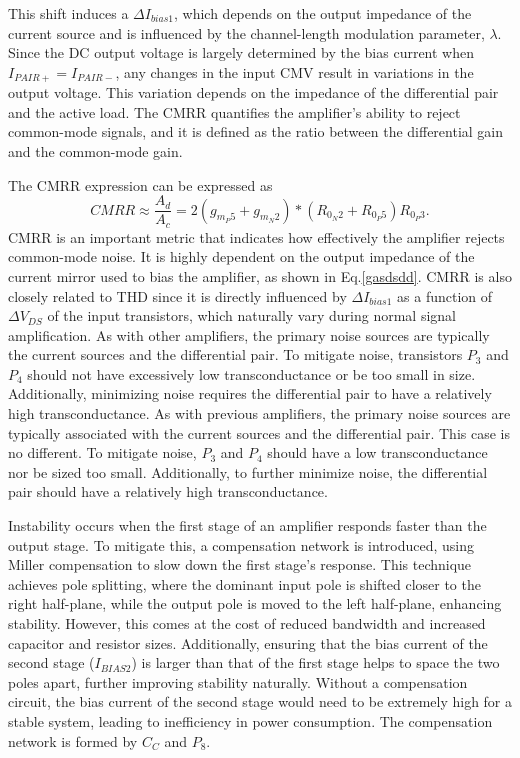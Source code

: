 \documentclass[12pt]{article}
\begin{document}
This shift induces a $\Delta I_{bias1}$, which depends on the output impedance of the current source and is influenced by the channel-length modulation parameter, $\lambda$.
Since the DC output voltage is largely determined by the bias current when $I_{PAIR+} = I_{PAIR-}$, any changes in the input CMV result in variations in the output voltage. This variation depends on the impedance of the differential pair and the active load. The CMRR quantifies the amplifier’s ability to reject common-mode signals, and it is defined as the ratio between the differential gain and the common-mode gain.

The CMRR expression can be expressed as
\begin{equation}
CMRR \approx \frac{A_d}{A_c} = 2(g_{m_P5}+g_{m_N2})*(R_{0_N2}+R_{0_P5})R_{0_P3}.
\label{gasdsdd}
\end{equation}
CMRR is an important metric that indicates how effectively the amplifier rejects common-mode noise. It is highly dependent on the output impedance of the current mirror used to bias the amplifier, as shown in Eq.\ref{gasdsdd}. CMRR is also closely related to THD since it is directly influenced by $\Delta I_{bias1}$ as a function of $\Delta V_{DS}$ of the input transistors, which naturally vary during normal signal amplification. As with other amplifiers, the primary noise sources are typically the current sources and the differential pair. To mitigate noise, transistors $P_3$ and $P_4$ should not have excessively low transconductance or be too small in size. Additionally, minimizing noise requires the differential pair to have a relatively high transconductance.
As with previous amplifiers, the primary noise sources are typically associated with the current sources and the differential pair. This case is no different. To mitigate noise, $P_3$ and $P_4$ should have a low transconductance nor be sized too small. Additionally, to further minimize noise, the differential pair should have a relatively high transconductance.


Instability occurs when the first stage of an amplifier responds faster than the output stage. To mitigate this, a compensation network is introduced, using Miller compensation to slow down the first stage’s response. This technique achieves pole splitting, where the dominant input pole is shifted closer to the right half-plane, while the output pole is moved to the left half-plane, enhancing stability. However, this comes at the cost of reduced bandwidth and increased capacitor and resistor sizes. Additionally, ensuring that the bias current of the second stage ($I_{BIAS2}$) is larger than that of the first stage helps to space the two poles apart, further improving stability naturally. Without a compensation circuit, the bias current of the second stage would need to be extremely high for a stable system, leading to inefficiency in power consumption. The compensation network is formed by $C_C$ and $P_8$.
\end{document}

